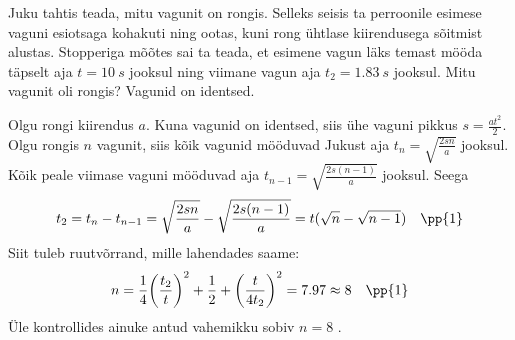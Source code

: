 \setAuthor{}

Juku tahtis teada, mitu vagunit on rongis. Selleks seisis ta perroonile esimese vaguni esiotsaga kohakuti ning ootas, kuni rong ühtlase kiirendusega sõitmist alustas.
Stopperiga mõõtes sai ta teada, et esimene vagun läks temast mööda täpselt aja $t=\SI{10}{s}$ jooksul ning viimane vagun aja  $t_2 = \SI{1.83}{s}$ jooksul. Mitu vagunit oli rongis?
Vagunid on identsed. 

\hint

\solu
Olgu rongi kiirendus $a$. Kuna vagunid on identsed, siis ühe vaguni pikkus $s=\frac{at^2}{2}$.  Olgu rongis $n$ vagunit, siis kõik vagunid mööduvad Jukust 
aja $t_n=\sqrt{\frac{2sn}{a}}$ jooksul.  Kõik peale viimase vaguni mööduvad aja $t_{n-1}=\sqrt{\frac{2s(n-1)}{a}}$ jooksul.  Seega 
$$t_2=t_n-t_{n-1}=\sqrt{\frac{2sn}{a}}-\sqrt{\frac{2s(n-1)}{a}}=t(\sqrt{n}-\sqrt{n-1}) \quad \pp{1}$$
Siit tuleb ruutvõrrand, mille lahendades saame:
$$n = \frac{1}{4}\bigg(\frac{t_2}{t}\bigg)^2 + \frac{1}{2} + \bigg(\frac{t}{4t_2}\bigg)^2 = 7.97 \approx 8 \quad \pp{1}$$
Üle kontrollides ainuke antud vahemikku sobiv $n=8$ .
\probend